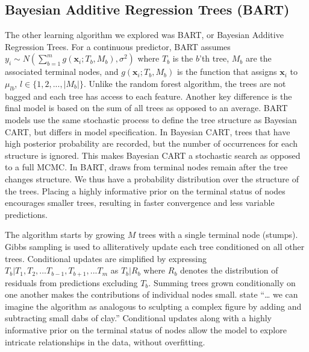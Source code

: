 \documentclass[
  12pt,
  letterpaper,
  DIV=11,
  numbers=noendperiod]{scrartcl}
\newcommand{\bm}{\mathbf}
\begin{document}
\subsection{Bayesian Additive Regression Trees
(BART)}\label{bayesian-additive-regression-trees-bart}

The other learning algorithm we explored was BART, or Bayesian Additive
Regression Trees. For a continuous predictor, BART assumes
\(y_i\sim N(\sum_{b=1}^m g(\bm x_i;T_b,M_b), \sigma^2)\) where \(T_b\)
is the \(b\)'th tree, \(M_b\) are the associated terminal nodes, and
\(g(\bm x_i;T_b,M_b)\) is the function that assigns \(\bm x_i\) to
\(\mu_{lb}\), \(l\in\{1,2,...,|M_b|\}\). Unlike the random forest
algorithm, the trees are not bagged and each tree has access to each
feature. Another key difference is the final model is based on the sum
of all trees as opposed to an average. BART models use the same
stochastic process to define the tree structure as Bayesian CART, but
differs in model specification. In Bayesian CART, trees that have high
posterior probability are recorded, but the number of occurrences for
each structure is ignored. This makes Bayesian CART a stochastic search
as opposed to a full MCMC. In BART, draws from terminal nodes remain
after the tree changes structure. We thus have a probability
distribution over the structure of the trees. Placing a highly
informative prior on the terminal status of nodes encourages smaller
trees, resulting in faster convergence and less variable predictions.

The algorithm starts by growing \(M\) trees with a single terminal node
(stumps). Gibbs sampling is used to alliteratively update each tree
conditioned on all other trees. Conditional updates are simplified by
expressing \(T_b|T_1,T_2,...T_{b-1},T_{b+1},...T_m\) as \(T_b|R_b\)
where \(R_b\) denotes the distribution of residuals from predictions
excluding \(T_b\). Summing trees grown conditionally on one another
makes the contributions of individual nodes small. \cite{bart_paper}
state ``\ldots{} we can imagine the algorithm as analogous to sculpting
a complex figure by adding and subtracting small dabs of clay.''
Conditional updates along with a highly informative prior on the
terminal status of nodes allow the model to explore intricate
relationships in the data, without overfitting.
\end{document}
